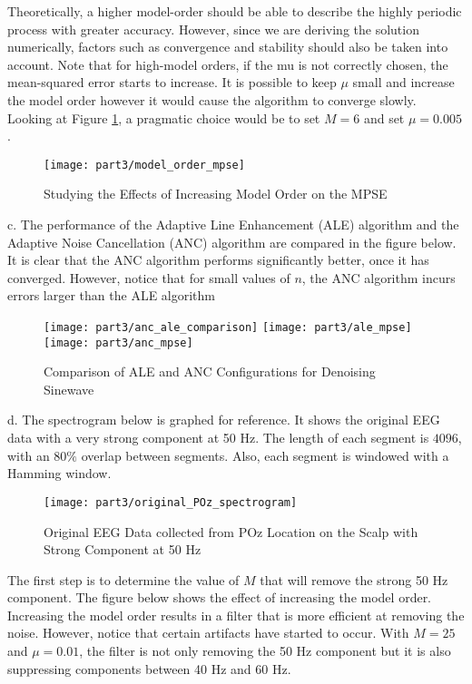 \noindent{}Theoretically, a higher model-order should be able to describe the highly periodic process with greater accuracy. However, since we are deriving the solution numerically, factors such as convergence and stability should also be taken into account. Note that for high-model orders, if the mu is not correctly chosen, the mean-squared error starts to increase. It is possible to keep $\mu$ small and increase the model order however it would cause the algorithm to converge slowly. Looking at Figure \ref{fig:ale_model}, a pragmatic choice would be to set $M=6$ and set $\mu=0.005$.

\begin{figure}[H]
\centering{}
\texttt{[image: part3/model\_order\_mpse]}
\caption{Studying the Effects of Increasing Model Order on the MPSE}
\label{fig:ale_model}
\end{figure}

\noindent{}c. The performance of the Adaptive Line Enhancement (ALE) algorithm and the Adaptive Noise Cancellation (ANC) algorithm are compared in the figure below. It is clear that the ANC algorithm performs significantly better, once it has converged. However, notice that for small values of $n$, the ANC algorithm incurs errors larger than the ALE algorithm
\begin{figure}[H]
\centering{}
\texttt{[image: part3/anc\_ale\_comparison]}
\texttt{[image: part3/ale\_mpse]}
\texttt{[image: part3/anc\_mpse]}
\caption{Comparison of ALE and ANC Configurations for Denoising Sinewave}
\end{figure}

\noindent{}d. The spectrogram below is graphed for reference. It shows the original EEG data with a very strong component at 50 Hz. The length of each segment is $4096$, with an $80\%$ overlap between segments. Also, each segment is windowed with a Hamming window. 

\begin{figure}[H]
\centering{}
\texttt{[image: part3/original\_POz\_spectrogram]}
\caption{Original EEG Data collected from POz Location on the Scalp with Strong Component at 50 Hz}
\end{figure}

\noindent{}The first step is to determine the value of $M$ that will remove the strong 50 Hz component. The figure below shows the effect of increasing the model order. Increasing the model order results in a filter that is more efficient at removing the noise. However, notice that certain artifacts have started to occur. With $M=25$ and $\mu=0.01$, the filter is not only removing the 50 Hz component but it is also suppressing components between 40 Hz and 60 Hz.

